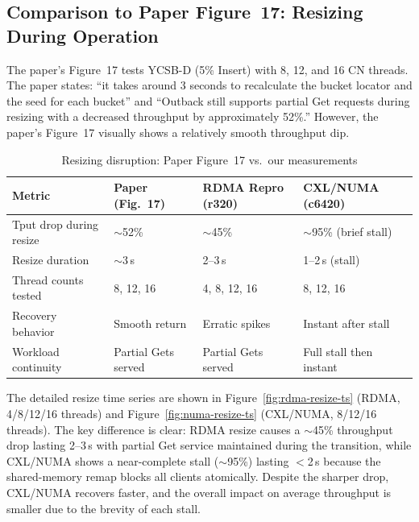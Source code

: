 \documentclass[11pt,a4paper]{article}
\begin{document}
\subsection{Comparison to Paper Figure~17: Resizing During Operation}

The paper's Figure~17 tests YCSB-D (5\% Insert) with 8, 12, and 16 CN threads. The paper states: ``it takes around 3 seconds to recalculate the bucket locator and the seed for each bucket'' and ``Outback still supports partial Get requests during resizing with a decreased throughput by approximately 52\%.'' However, the paper's Figure~17 visually shows a relatively smooth throughput dip.

\begin{table}[H]
\centering
\caption{Resizing disruption: Paper Figure~17 vs.\ our measurements}
\label{tab:resize-cmp}
\small
\begin{tabular}{@{}lp{2.8cm}p{2.8cm}p{2.8cm}@{}}
\toprule
\textbf{Metric} & \textbf{Paper (Fig.~17)} & \textbf{RDMA Repro (r320)} & \textbf{CXL/NUMA (c6420)} \\
\midrule
Tput drop during resize & $\sim$52\% & $\sim$45\% & $\sim$95\% (brief stall) \\
Resize duration & $\sim$3\,s & 2--3\,s & 1--2\,s (stall) \\
Thread counts tested & 8, 12, 16 & 4, 8, 12, 16 & 8, 12, 16 \\
Recovery behavior & Smooth return & Erratic spikes & Instant after stall \\
Workload continuity & Partial Gets served & Partial Gets served & Full stall then instant \\
\bottomrule
\end{tabular}
\end{table}

The detailed resize time series are shown in Figure~\ref{fig:rdma-resize-ts} (RDMA, 4/8/12/16 threads) and Figure~\ref{fig:numa-resize-ts} (CXL/NUMA, 8/12/16 threads). The key difference is clear: RDMA resize causes a $\sim$45\% throughput drop lasting 2--3\,s with partial Get service maintained during the transition, while CXL/NUMA shows a near-complete stall ($\sim$95\%) lasting $<$2\,s because the shared-memory remap blocks all clients atomically. Despite the sharper drop, CXL/NUMA recovers faster, and the overall impact on average throughput is smaller due to the brevity of each stall.
\end{document}
